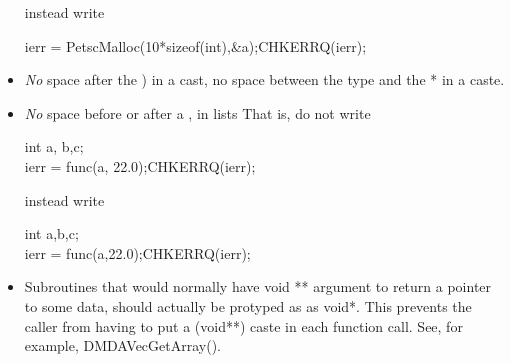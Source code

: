 \documentclass[twoside,12pt]{../sty/report_petsc}
\begin{document}
\begin{itemize}
\begin{tabbing}
\end{tabbing}
instead write
\begin{tabbing}
   ierr = PetscMalloc(10*sizeof(int),\&a);CHKERRQ(ierr);
\end{tabbing}
\item {\em No} space after the ) in a cast, no space between the type and the * in a caste.
\item {\em No} space before or after a , in lists
That is, do not write
\begin{tabbing}
    int a, b,c;\\
    ierr = func(a, 22.0);CHKERRQ(ierr);
\end{tabbing}
instead write
\begin{tabbing}
    int a,b,c;\\
    ierr = func(a,22.0);CHKERRQ(ierr);
\end{tabbing}

\item Subroutines that would normally have void ** argument to return a pointer to some data, should actually be protyped as as void*. This prevents the caller from having to put a (void**) caste in each function call. See, for example, DMDAVecGetArray().


\end{itemize}
\end{document}
